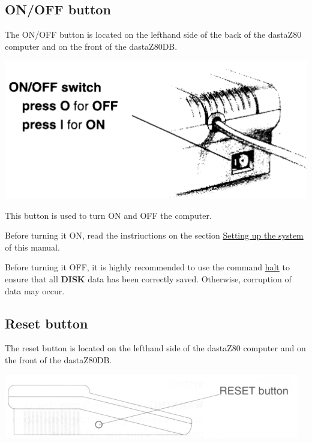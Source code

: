     \pagebreak
    
    \subsection{ON/OFF button}
    \label{subsec:onoffbutt}

    The ON/OFF button is located on the lefthand side of the back of the
    dastaZ80 computer and on the front of the dastaZ80DB.

    \includegraphics[scale=0.5]{images/onoffbutton.png}

    This button is used to turn ON and OFF the computer.

    Before turning it ON, read the instriuctions on the section
    \hyperref[sec:setting_system]{Setting up the system} of this manual.

    Before turning it OFF, it is highly recommended to use the command 
    \hyperref[cmd:halt]{halt} to ensure that all \textbf{DISK} data has been
    correctly saved. Otherwise, corruption of data may occur.

    \subsection{Reset button}
    \label{subsec:resetbutton}

    The reset button is located on the lefthand side of the dastaZ80 computer
    and on the front of the dastaZ80DB.

    \includegraphics[scale=0.7]{images/resetbutton.png}


